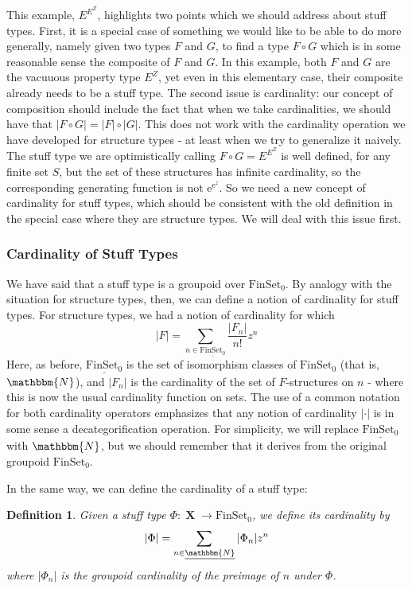 \documentclass{amsart} \usepackage{amsmath,amssymb,bbm}
\newcommand{\opname}[1]{\operatorname{#1}}
\newtheorem{definition}{Definition}
\newcommand{\catname}[1]{\boldsymbol{\opname{{#1}}}}
\newcommand{\FSN}{\catname{FinSet_0}}
\newcommand{\mathe}{\mathrm{e}}
\begin{document}
This example, $E^{E^Z}$, highlights two points which we should address
about stuff types.  First, it is a special case of something we would
like to be able to do more generally, namely given two types $F$ and
$G$, to find a type $F \circ G$ which is in some reasonable sense the
composite of $F$ and $G$.  In this example, both $F$ and $G$ are the
vacuuous property type $E^Z$, yet even in this elementary case, their
composite already needs to be a stuff type.  The second issue is
cardinality: our concept of composition should include the fact that
when we take cardinalities, we should have that $|F \circ G| = |F|
\circ |G|$.  This does not work with the cardinality operation we have
developed for structure types - at least when we try to generalize it
naively.  The stuff type we are optimistically calling $F \circ G =
E^{E^Z}$ is well defined, for any finite set $S$, but the set of these
structures has infinite cardinality, so the corresponding generating
function is not $\mathe^{\mathe^z}$.  So we need a new concept of
cardinality for stuff types, which should be consistent with the old
definition in the special case where they are structure types.  We
will deal with this issue first.

\subsubsection{Cardinality of Stuff Types}

We have said that a stuff type is a groupoid over
$\FSN$.  By analogy with the situation for structure
types, then, we can define a notion of cardinality for stuff types.  For
structure types, we had a notion of cardinality for which 
\begin{equation}
 |F| = \sum_{n \in \underline{\FSN}} \frac{|F_n |}{n!} z^n
\end{equation}
Here, as before, $\underline{\FSN}$ is the set of
isomorphism classes of $\FSN$ (that is, $\mathbbm{N}$),
and $|F_n |$ is the cardinality of the set of $F$-structures on $n$ - where
this is now the usual cardinality function on sets.  The use of a common
notation for both cardinality operators emphasizes that any notion of
cardinality $| \cdot |$ is in some sense a decategorification operation.  For
simplicity, we will replace $\underline{\FSN}$ with
$\mathbbm{N}$, but we should remember that it derives from the original
groupoid $\FSN$.

In the same way, we can define the cardinality of a stuff type:

\begin{definition}\label{def:stuffcard}
  Given a stuff type $\text{$\Phi : \catname{X} \rightarrow
  \FSN$}$, we define its cardinality by
  \begin{equation}
    | \Phi | = \sum_{n \in \underline{\mathbbm{N}}} | \Phi_n |z^n
  \end{equation}
  where $|\Phi_n|$ is the {\textit{groupoid cardinality}} of the preimage of $n$ under
  $\Phi$.
\end{definition}
\end{document}
